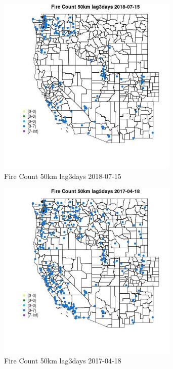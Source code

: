 \begin{figure} 
\centering  
\includegraphics[width=0.77\textwidth]{Code_Outputs/Report_ML_input_PM25_Step4_part_e_de_duplicated_aves_compiled_2019-05-21wNAs_MapObsFire_Count_50km_lag3days2018-07-15.jpg} 
\caption{\label{fig:Report_ML_input_PM25_Step4_part_e_de_duplicated_aves_compiled_2019-05-21wNAsMapObsFire_Count_50km_lag3days2018-07-15}Fire Count 50km lag3days 2018-07-15} 
\end{figure} 
 

\clearpage 

\begin{figure} 
\centering  
\includegraphics[width=0.77\textwidth]{Code_Outputs/Report_ML_input_PM25_Step4_part_e_de_duplicated_aves_compiled_2019-05-21wNAs_MapObsFire_Count_50km_lag3days2017-04-18.jpg} 
\caption{\label{fig:Report_ML_input_PM25_Step4_part_e_de_duplicated_aves_compiled_2019-05-21wNAsMapObsFire_Count_50km_lag3days2017-04-18}Fire Count 50km lag3days 2017-04-18} 
\end{figure} 
 

